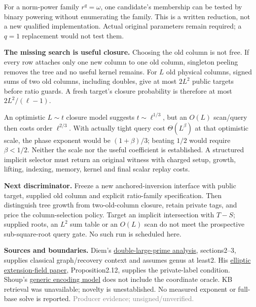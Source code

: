 \documentclass[10pt]{article}
\newcommand{\scope}{\textcolor{gray}{\footnotesize Producer evidence; unsigned/unverified.}}
\begin{document}
For a norm-power family $r^q=\omega$, one candidate's membership can be
tested by binary powering without enumerating the family. This is a written
reduction, not a new qualified implementation. Actual original parameters
remain required; a $q=1$ replacement would not test them.

\textbf{The missing search is useful closure.} Choosing the old column is
not free. If every row attaches only one new column to one old column,
singleton peeling removes the tree and no useful kernel remains. For $L$
old physical columns, signed sums of two old columns, including doubles,
give at most $2L^2$ public targets before ratio guards. A fresh target's
closure probability is therefore at most $2L^2/(\ell-1)$.

An optimistic $L\sim t$ closure model suggests $t\sim\ell^{1/3}$, but an
$O(L)$ scan/query then costs order $\ell^{2/3}$. With actually tight query
cost $\Theta(L^\beta)$ at that optimistic scale, the phase exponent would be
$(1+\beta)/3$; beating $1/2$ would require $\beta<1/2$. Neither the scale nor
the useful coefficient is established. A structured implicit selector must
return an original witness with charged setup, growth, lifting, indexing,
memory, kernel and final scalar replay costs.

\textbf{Next discriminator.} Freeze a new anchored-inversion interface with
public target, supplied old column and explicit ratio-family specification.
Then distinguish tree growth from two-old-column closure, retain private tags,
and price the column-selection policy. Target an implicit intersection with
$T-S$; supplied roots, an $L^2$ sum table or an $O(L)$ scan do not meet the
prospective sub-square-root query gate. No such run is scheduled here.

\textbf{Sources and boundaries.} Diem's
\href{https://arxiv.org/pdf/math/0606607}{double-large-prime analysis},
sections2--3, supplies classical graph/recovery context and assumes genus
at least2. His \href{https://doi.org/10.1112/S0010437X10005075}{elliptic extension-field paper},
Proposition2.12, supplies the private-label condition. Shoup's
\href{https://www.shoup.net/papers/dlbounds1.pdf}{generic encoding model}
does not include the coordinate oracle. KB retrieval was unavailable;
novelty is unestablished. No measured exponent or full-base solve is reported.
\scope
\end{document}
